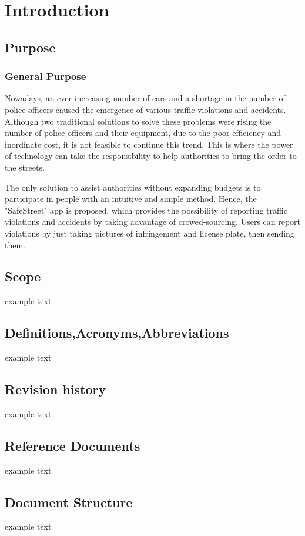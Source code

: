 \section{Introduction}

\subsection{Purpose}
\subsubsection{General Purpose}
Nowadays, an ever-increasing number of cars and a shortage in the number of police officers caused the emergence of various traffic violations and accidents. Although two traditional solutions to solve these problems were rising the number of police officers and their equipment, due to the poor efficiency and inordinate cost, it is not feasible to continue this trend. This is where the power of technology can take the responsibility to help authorities to bring the order to the streets.

The only solution to assist authorities without expanding budgets is to participate in people with an intuitive and simple method. Hence, the "SafeStreet" app is proposed, which provides the possibility of reporting traffic violations and accidents by taking advantage of crowed-sourcing. Users can report violations by just taking pictures of infringement and license plate, then sending them.


\subsection{Scope}
	example text


\subsection{Definitions,Acronyms,Abbreviations}
	example text


\subsection{Revision history}
	example text


\subsection{Reference Documents}
	example text


\subsection{Document Structure}
	example text

